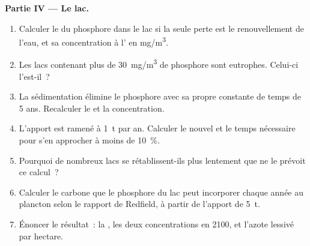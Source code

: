 \begin{problem}
\medskip
\noindent\textbf{Partie IV --- Le lac.}
\begin{enumerate}[resume]
  \item Calculer le  du phosphore dans le lac si la
        seule perte est le renouvellement de l'eau, et sa concentration à
        l' en \unit{mg/m^3}.
  \item Les lacs contenant plus de \qty{30}{mg/m^3} de phosphore sont
        eutrophes. Celui-ci l'est-il~?
  \item La sédimentation élimine le phosphore avec sa propre constante de
        temps de 5 ans. Recalculer le  et la
        concentration.
  \item L'apport est ramené à \qty{1}{t} par an. Calculer le nouvel  et le temps nécessaire pour s'en approcher à moins de
        \qty{10}{\%}.
  \item Pourquoi de nombreux lacs se rétablissent-ils plus lentement que ne
        le prévoit ce calcul~?
  \item Calculer le carbone que le phosphore du lac peut incorporer
        chaque année au plancton selon le rapport de Redfield, à partir de
        l'apport de \qty{5}{t}.
  \item Énoncer le résultat~: la , les deux
        concentrations en 2100, et l'azote lessivé par hectare.
\end{enumerate}
\end{problem}
